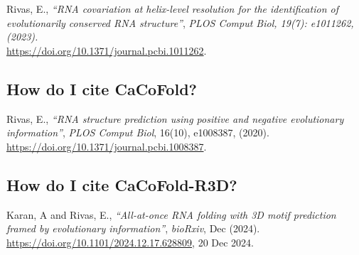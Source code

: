 \noindent
Rivas, E., \textit{``RNA covariation at helix-level resolution for the identification of evolutionarily conserved RNA structure''},
\textit{PLOS Comput Biol, 19(7): e1011262, (2023).}\\
  \url{https://doi.org/10.1371/journal.pcbi.1011262}.

\subsection{How do I cite CaCoFold?}

Rivas, E., \textit{``RNA structure prediction using
  positive and negative evolutionary information''},
\textit{PLOS Comput Biol}, 16(10), e1008387, (2020).\\
\url{https://doi.org/10.1371/journal.pcbi.1008387}.

\subsection{How do I cite CaCoFold-R3D?}

Karan, A and Rivas, E., \textit{``All-at-once RNA folding with 3D motif prediction framed by evolutionary information''},
\textit{bioRxiv}, Dec (2024).\\
\url{https://doi.org/10.1101/2024.12.17.628809}, 20 Dec 2024.\\






  









